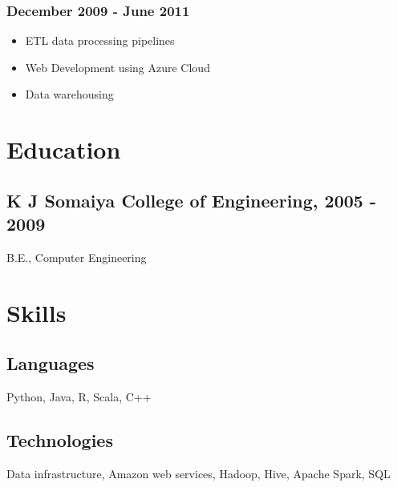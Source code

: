 \documentclass[letterpaper]{article}
\begin{document}
\subsubsection{December 2009 - June 2011}
\label{sec:December-2009-June-2011}
\begin{itemize}
\item ETL data processing pipelines
\item Web Development using Azure Cloud
\item Data warehousing
\end{itemize}
\section{Education}
\label{sec:Education}
\subsection{K J Somaiya College of Engineering, 2005 - 2009}
\label{sec:K-J-Somaiya-College-of-Engineering-2005-2009}
B.E., Computer Engineering
\section{Skills}
\label{sec:Skills}
\subsection{Languages}
\label{sec:Languages}
Python,
Java,
R,
Scala,
C++
\subsection{Technologies}
\label{sec:Technologies}
Data infrastructure,
Amazon web services,
Hadoop,
Hive,
Apache Spark,
SQL
\end{document}
